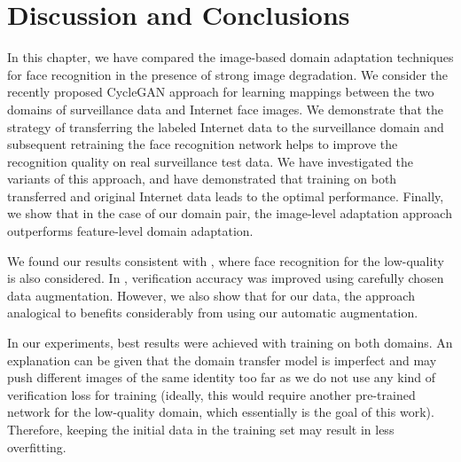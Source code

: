 
\section{Discussion and Conclusions}
\label{sect:conclusion}


 In this chapter, we have compared the image-based domain adaptation techniques for face recognition in the presence of strong image degradation. We consider the recently proposed CycleGAN approach for learning mappings between the two domains of surveillance data and Internet face images. We demonstrate that the strategy of transferring the labeled Internet data to the surveillance domain and subsequent retraining the face recognition network helps to improve the recognition quality on real surveillance test data. We have investigated the variants of this approach, and have demonstrated that training on both transferred and original Internet data leads to the optimal performance. Finally, we show that in the case of our domain pair, the image-level adaptation approach outperforms feature-level domain adaptation. 

 We found our results consistent with \citep{SohnLZY0C17}, where face recognition for the low-quality is also considered. In \citep{SohnLZY0C17},  verification accuracy was improved using carefully chosen data augmentation. However, we also show that for our data, the approach analogical to \citep{SohnLZY0C17} benefits considerably from using our automatic augmentation. 


In our experiments, best results were achieved with training on both domains. An explanation can be given that the domain transfer model is imperfect and may push different images of the same identity too far as we do not use any kind of verification loss for training (ideally, this would require another pre-trained network for the low-quality domain, which essentially is the goal of this work). Therefore, keeping the initial data in the training set may result in less overfitting. %

